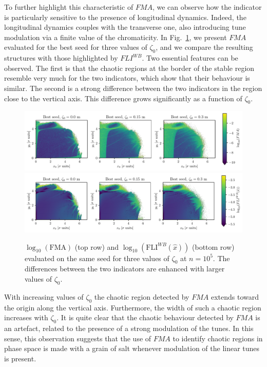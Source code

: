 To further highlight this characteristic of $FMA$, we can observe how the indicator is particularly sensitive to the presence of longitudinal dynamics. Indeed, the longitudinal dynamics couples with the transverse one, also introducing tune modulation via a finite value of the chromaticity. In Fig.~\ref{fig:fma_vs_fli}, we present $FMA$ evaluated for the best seed for three values of $\zeta_0$, and we compare the resulting structures with those highlighted by $FLI^{WB}$. Two essential features can be observed. The first is that the chaotic regions at the border of the stable region resemble very much for the two indicators, which show that their behaviour is similar. The second is a strong difference between the two indicators in the region close to the vertical axis. This difference grows significantly as a function of $\zeta_0$. 
%
\begin{figure}[ht]
    \centering
    \includegraphics[width=1.0\textwidth]{6_lhc_dynamic_indicators/figs/FMA.pdf}
    \includegraphics[width=1.0\textwidth]{6_lhc_dynamic_indicators/figs/FMA_addendum.pdf}
    \caption{$\log_{10}(\mathrm{FMA})$ (top row) and $\log_{10}(\mathrm{FLI}^{WB}(\hat{x}))$ (bottom row) evaluated on the same seed for three values of $\zeta_0$ at $n=10^5$. The differences between the two indicators are enhanced with larger values of $\zeta_0$.}
    \label{fig:fma_vs_fli}
\end{figure}
%
With increasing values of $\zeta_0$ the chaotic region detected by $FMA$ extends toward the origin along the vertical axis. Furthermore, the width of such a chaotic region increases with $\zeta_0$. It is quite clear that the chaotic behaviour detected by $FMA$ is an artefact, related to the presence of a strong modulation of the tunes. In this sense, this observation suggests that the use of $FMA$ to identify chaotic regions in phase space is made with a grain of salt whenever modulation of the linear tunes is present.   

